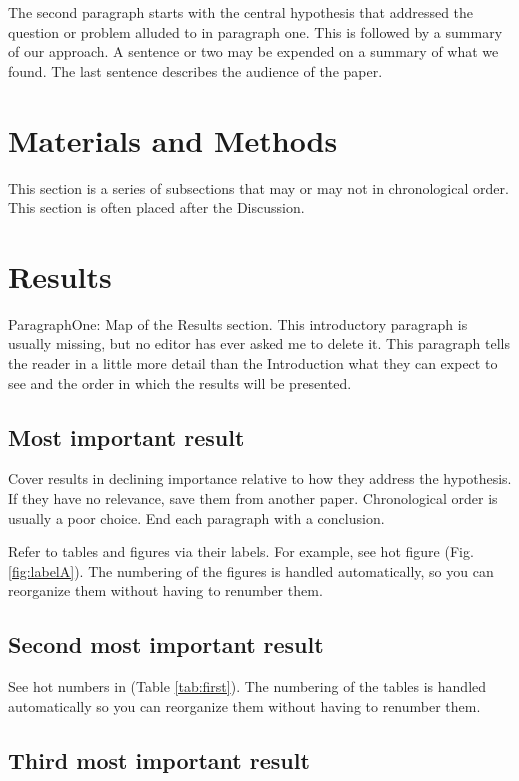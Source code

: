 \documentclass[11pt,letterpaper]{article}
\begin{document}
The second paragraph starts with the central hypothesis that addressed the question or problem alluded to in paragraph one.
This is followed by a summary of our approach.
A sentence or two may be expended on a summary of what we found.
The last sentence describes the audience of the paper.



\section*{Materials and Methods}

This section is a series of subsections that may or may not in chronological order.
This section is often placed after the Discussion.

\section*{Results}

ParagraphOne: Map of the Results section. 
This introductory paragraph is usually missing, but no editor has ever asked me to delete it.
This paragraph tells the reader in a little more detail than the Introduction what they can expect to see and the order in which the results will be presented.


\subsection*{Most important result}
Cover results in declining importance relative to how they address the hypothesis. 
If they have no relevance, save them from another paper.
Chronological order is usually a poor choice.
End each paragraph with a conclusion.

Refer to tables and figures via their labels.
For example, see hot figure (Fig. \ref{fig:labelA}).
The numbering of the figures is handled automatically, so you can reorganize them without having to renumber them.

\subsection*{Second most important result}

See hot numbers in (Table \ref{tab:first}).
The numbering of the tables is handled automatically so you can reorganize them without having to renumber them.


\subsection*{Third most important result}
\end{document}
